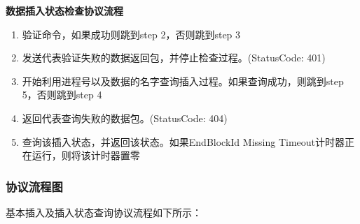 \textbf{数据插入状态检查协议流程}
\begin{enumerate}[step 1.]
\item 验证命令，如果成功则跳到step 2，否则跳到step 3
\item 发送代表验证失败的数据返回包，并停止检查过程。(StatusCode: 401)
\item 开始利用进程号以及数据的名字查询插入过程。如果查询成功，则跳到step 5，否则跳到step 4
\item 返回代表查询失败的数据包。(StatusCode: 404)
\item 查询该插入状态，并返回该状态。如果EndBlockId Missing Timeout计时器正在运行，则将该计时器置零
\end{enumerate}

\subsubsection{协议流程图}
基本插入及插入状态查询协议流程如下所示：

